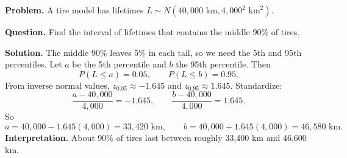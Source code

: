 \begin{ExamProblems}
		\textbf{Problem.}
		A tire model has lifetimes \(L\sim N(40{,}000\text{ km}, 4{,}000^2\text{ km}^2)\).
		
		\textbf{Question.} Find the interval of lifetimes that contains the middle 90\% of tires.
		
		\textbf{Solution.}
		The middle 90\% leaves 5\% in each tail, so we need the 5th and 95th percentiles.
		Let \(a\) be the 5th percentile and \(b\) the 95th percentile. Then
		\[
		P(L\le a)=0.05,\qquad P(L\le b)=0.95.
		\]
		From inverse normal values, \(z_{0.05}\approx -1.645\) and \(z_{0.95}\approx 1.645\).
		Standardize:
		\[
		\frac{a-40{,}000}{4{,}000}=-1.645,\qquad \frac{b-40{,}000}{4{,}000}=1.645.
		\]
		So
		\[
		a=40{,}000-1.645(4{,}000)=33{,}420\text{ km},\qquad b=40{,}000+1.645(4{,}000)=46{,}580\text{ km}.
		\]
		\textbf{Interpretation.} About 90\% of tires last between roughly 33{,}400 km and 46{,}600 km.
		
	\end{ExamProblems}
	
	
